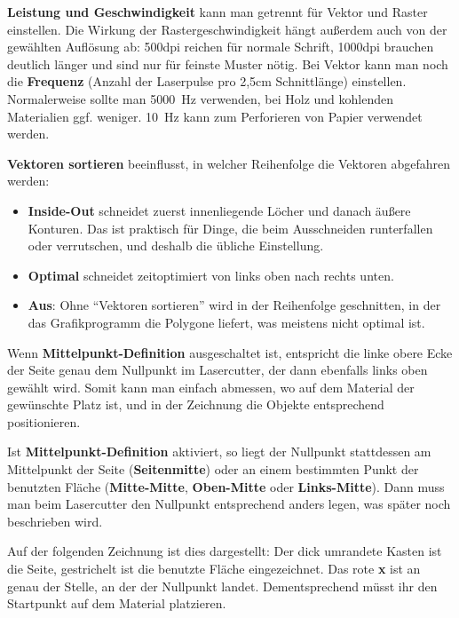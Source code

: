 \documentclass{\basedir/fablab-document}
\begin{document}
	\textbf{Leistung und Geschwindigkeit} kann man getrennt für Vektor und Raster einstellen. Die Wirkung der Rastergeschwindigkeit hängt außerdem auch von der gewählten Auflösung ab: 500dpi reichen für normale Schrift, 1000dpi brauchen deutlich länger und sind nur für feinste Muster nötig. Bei Vektor kann man noch die \textbf{Frequenz} (Anzahl der Laserpulse pro 2,5cm Schnittlänge) einstellen. Normalerweise sollte man 5000~Hz verwenden, bei Holz und kohlenden Materialien ggf. weniger. 10~Hz kann zum Perforieren von Papier verwendet werden. %

	\textbf{Vektoren sortieren} beeinflusst, in welcher Reihenfolge die Vektoren abgefahren werden:
	\begin{itemize}
		\item \textbf{Inside-Out} schneidet zuerst innenliegende Löcher und danach äußere Konturen.  Das ist praktisch für Dinge, die beim Ausschneiden runterfallen oder verrutschen, und deshalb die übliche Einstellung.
		\item \textbf{Optimal} schneidet zeitoptimiert von links oben nach rechts unten.
		\item \textbf{Aus}: Ohne \enquote{Vektoren sortieren} wird in der Reihenfolge geschnitten, in der das Grafikprogramm die Polygone liefert, was meistens nicht optimal ist.
	\end{itemize}


	Wenn \textbf{Mittelpunkt-Definition} ausgeschaltet ist, entspricht die linke obere Ecke der Seite genau dem Nullpunkt im Lasercutter, der dann ebenfalls links oben gewählt wird. Somit kann man einfach abmessen, wo auf dem Material der gewünschte Platz ist, und in der Zeichnung die Objekte entsprechend positionieren.

	Ist \textbf{Mittelpunkt-Definition} aktiviert, so liegt der Nullpunkt stattdessen am Mittelpunkt der Seite (\textbf{Seiten\-mitte}) oder an einem bestimmten Punkt der benutzten Fläche (\textbf{Mitte-Mitte}, \textbf{Oben-Mitte} oder \textbf{Links-Mitte}). Dann muss man beim Lasercutter den Nullpunkt entsprechend anders legen, was später noch beschrieben wird.

	Auf der folgenden Zeichnung ist dies dargestellt: Der dick umrandete Kasten ist die Seite, gestrichelt ist die benutzte Fläche eingezeichnet. Das rote \textbf{x} ist an genau der Stelle, an der der Nullpunkt landet. Dementsprechend müsst ihr den Startpunkt auf dem Material platzieren.
\end{document}
